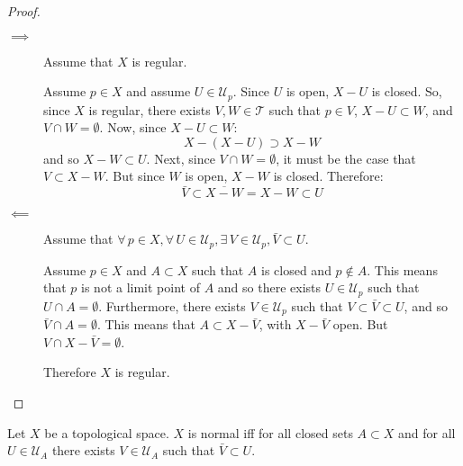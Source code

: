 \documentclass[letterpaper,12pt,fleqn]{article}
\newcommand{\T}{\mathscr{T}}
\newcommand{\U}{\mathcal{U}}
\begin{document}
\begin{proof}
  \begin{description}
  \item[]
  \item[\(\implies\)] Assume that \(X\) is regular.

    Assume \(p\in X\) and assume \(U\in\U_p\).  Since \(U\) is open, \(X-U\) is closed.  So, since \(X\) is
    regular, there exists \(V,W\in\T\) such that \(p\in V\), \(X-U\subset W\), and \(V\cap W=\emptyset\).
    Now, since \(X-U\subset W\):
    \[X-(X-U)\supset X-W\]
    and so \(X-W\subset U\).  Next, since \(V\cap W=\emptyset\), it must be the case that \(V\subset X-W\).  But
    since \(W\) is open, \(X-W\) is closed.  Therefore:
    \[\bar{V}\subset\overline{X-W}=X-W\subset U\]

  \item[\(\impliedby\)] Assume that \(\forall\,p\in X,\forall\,U\in\U_p,\exists\,V\in\U_p,\bar{V}\subset U\).

    Assume \(p\in X\) and \(A\subset X\) such that \(A\) is closed and \(p\notin A\).  This means that \(p\) is
    not a limit point of \(A\) and so there exists \(U\in\U_p\) such that \(U\cap A=\emptyset\).  Furthermore,
    there exists \(V\in\U_p\) such that \(V\subset\bar{V}\subset U\), and so \(\bar{V}\cap A=\emptyset\).  This
    means that \(A\subset X-\bar{V}\), with \(X-\bar{V}\) open.  But \(V\cap X-\bar{V}=\emptyset\).

    Therefore \(X\) is regular.
  \end{description}
\end{proof}

\begin{theorem}
  Let \(X\) be a topological space.  \(X\) is normal iff for all closed sets \(A\subset X\) and for all
  \(U\in\U_A\) there exists \(V\in\U_A\) such that \(\bar{V}\subset U\).
\end{theorem}
\end{document}
